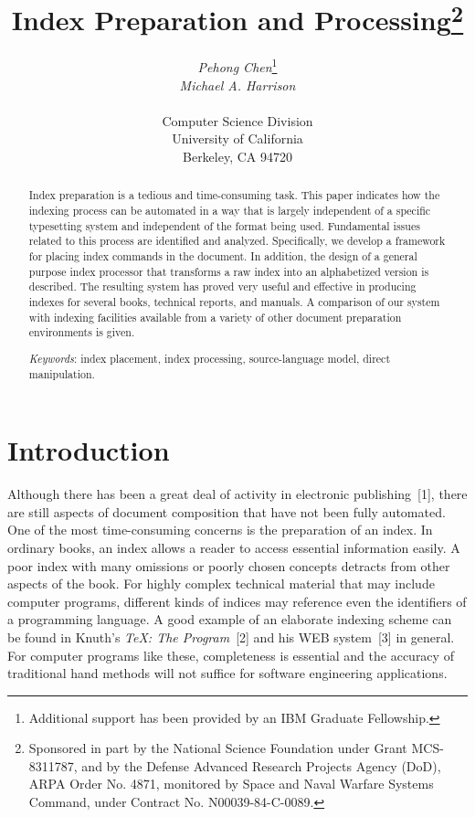 


\title{Index Preparation and Processing\thanks{Sponsored
in part by the National Science Foundation under Grant MCS-8311787,
and by the Defense Advanced Research Projects Agency (DoD),
ARPA Order No. 4871, monitored by Space and Naval Warfare Systems Command,
under Contract No. N00039-84-C-0089.}
}

\author{{\sl Pehong Chen}\thanks{Additional support has been provided
by an IBM Graduate Fellowship.}\\
	{\sl Michael A. Harrison}\\\\
	Computer Science Division \\
	University of California \\
	Berkeley, CA 94720
}

\def\today{}
\maketitle

\begin{abstract}
\singlespace
Index preparation is a tedious and time-consuming task.
This paper indicates how the indexing process can be automated
in a way that is largely independent of a specific typesetting system
and independent of the format being used.
Fundamental issues related to this process are identified and analyzed.
Specifically, we develop a framework for placing index
commands in the document.  In addition, the design of
a general purpose index processor that 
transforms a raw index into an alphabetized version is described.
The resulting system has proved very useful and effective in producing
indexes for several books, technical reports, and manuals.
A comparison of our system with indexing facilities
available from a variety of other document preparation environments is given.

{\it Keywords\/}: index placement, index processing, source-language model,
direct manipulation.
\end{abstract}

\section{Introduction}
Although there has been a great deal of activity in
electronic publishing~[1],
there are still aspects of document composition that have not been
fully automated.
One of the most time-consuming concerns is the preparation of an index.
In ordinary books, an index allows a reader to
access essential information easily.
A poor index with many omissions or poorly chosen concepts
detracts from other aspects of the book.
For highly complex technical material that may include computer programs,
different kinds of indices may
reference even the identifiers of a programming language.  A good example
of an elaborate indexing scheme can be found in Knuth's
{\it {\TeX}: The Program\/}~[2] and his WEB system~[3] in general.
For computer programs like these,
completeness is essential and the accuracy of
traditional hand methods will not suffice for software engineering
applications.

